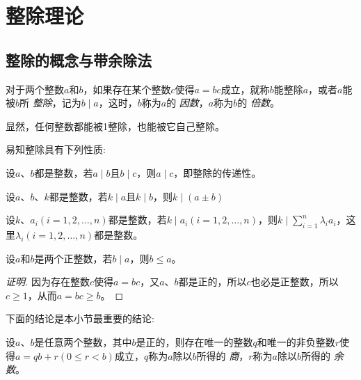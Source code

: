 
\section{整除理论}
\label{sec:integer-division}

\subsection{整除的概念与带余除法}
\label{sec:concept-of-integer-indivision-and-devision-with-remainder}

\begin{definition}
  对于两个整数$a$和$b$，如果存在某个整数$c$使得$a=bc$成立，就称$b$能整除$a$，或者$a$能被$b$所 \emph{整除}，记为$b \mid a$，这时，$b$称为$a$的 \emph{因数}，$a$称为$b$的 \emph{倍数}。
\end{definition}

显然，任何整数都能被1整除，也能被它自己整除。

易知整除具有下列性质:
\begin{property}
  设$a$、$b$都是整数，若$a \mid b$且$b \mid c$，则$a \mid c$，即整除的传递性。
\end{property}

\begin{property}
  设$a$、$b$、$k$都是整数，若$k \mid a$且$k \mid b$，则$k \mid (a \pm b)$
\end{property}

\begin{property}
  设$k$、$a_i(i=1,2,\ldots,n)$都是整数，若$k \mid a_i(i=1,2,\ldots,n)$，则$k \mid \sum_{i=1}^n \lambda_i a_i$，这里$\lambda_i(i=1,2,\ldots,n)$都是整数。
\end{property}

\begin{property}
  \label{property:b-mid-a-to-b-leqslant-a}
  设$a$和$b$是两个正整数，若$b \mid a$，则$b \leqslant a$。
\end{property}

\begin{proof}[证明]
  因为存在整数$c$使得$a=bc$，又$a$、$b$都是正的，所以$c$也必是正整数，所以$c \geqslant 1$，从而$a=bc \geqslant b$。
\end{proof}

下面的结论是本小节最重要的结论:
\begin{theorem}[带余除法]
  设$a$、$b$是任意两个整数，其中$b$是正的，则存在唯一的整数$q$和唯一的非负整数$r$使得$a=qb+r(0 \leqslant r < b)$成立，$q$称为$a$除以$b$所得的 \emph{商}，$r$称为$a$除以$b$所得的 \emph{余数}。
\end{theorem}

